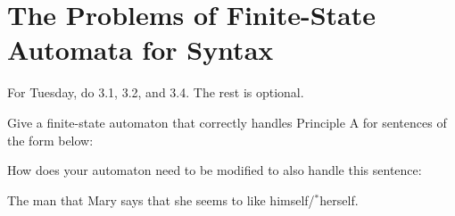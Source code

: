 \chapter{The Problems of Finite-State Automata for Syntax}
\label{cha:REGsyntax}

For Tuesday, do 3.1, 3.2, and 3.4. The rest is optional.

\begin{exercise}
    Give a finite-state automaton that correctly handles Principle A for sentences of the form below:
    \begin{exe}
        \ex
        \begin{xlist}
        \end{xlist}
        \ex
        \begin{xlist}
        \end{xlist}
        \ex
        \begin{xlist}
        \end{xlist}
    \end{exe}
\end{exercise}

\begin{exercise}
    How does your automaton need to be modified to also handle this sentence:
    \begin{exe}
        \ex The man that Mary says that she seems to like himself\slash$^*$herself.
    \end{exe}
\end{exercise}

